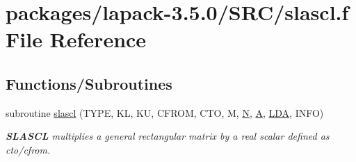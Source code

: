 \hypertarget{slascl_8f}{}\section{packages/lapack-\/3.5.0/\+S\+R\+C/slascl.f File Reference}
\label{slascl_8f}
\subsection*{Functions/\+Subroutines}
\begin{DoxyCompactItemize}
\item 
subroutine \hyperlink{group__auxOTHERauxiliary_ga11e6ce67ce97ca5b0a3a7bc5645a09d9}{slascl} (T\+Y\+P\+E, K\+L, K\+U, C\+F\+R\+O\+M, C\+T\+O, M, \hyperlink{polmisc_8c_a0240ac851181b84ac374872dc5434ee4}{N}, \hyperlink{classA}{A}, \hyperlink{example__user_8c_ae946da542ce0db94dced19b2ecefd1aa}{L\+D\+A}, I\+N\+F\+O)
\begin{DoxyCompactList}\small\item\em {\bfseries S\+L\+A\+S\+C\+L} multiplies a general rectangular matrix by a real scalar defined as cto/cfrom. \end{DoxyCompactList}\end{DoxyCompactItemize}
